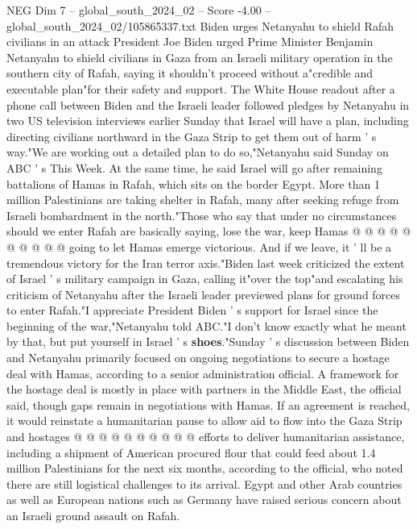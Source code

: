 \begin{textsample}{NEG Dim 7 – global\_south\_2024\_02 – Score -4.00 – global\_south\_2024\_02/105865337.txt}  \label{ex:f7_neg_399}
Biden urges Netanyahu to shield Rafah civilians in an attack President Joe Biden urged Prime Minister Benjamin Netanyahu to shield civilians in Gaza from an Israeli military operation in the southern city of Rafah, saying it shouldn't proceed without a"credible and executable plan"for their safety and support.
The White House readout after a phone call between Biden and the Israeli leader followed pledges by Netanyahu in two US television interviews earlier Sunday that Israel will have a plan, including directing civilians northward in the Gaza Strip to get them out of harm ' s way."We are working out a detailed plan to do so,"Netanyahu said Sunday on ABC ' s This Week.
At the same time, he said Israel will go after remaining battalions of Hamas in Rafah, which sits on the border Egypt.
More than 1 million Palestinians are taking shelter in Rafah, many after seeking refuge from Israeli bombardment in the north."Those who say that under no circumstances should we enter Rafah are basically saying, lose the war, keep Hamas @ @ @ @ @ @ @ @ @ @ going to let Hamas emerge victorious.
And if we leave, it ' ll be a tremendous victory for the Iran terror axis."Biden last week criticized the extent of Israel ' s military campaign in Gaza, calling it"over the top"and escalating his criticism of Netanyahu after the Israeli leader previewed plans for ground forces to enter Rafah."I appreciate President Biden ' s support for Israel since the beginning of the war,"Netanyahu told ABC."I don't know exactly what he meant by that, but put yourself in Israel ' s \textbf{shoes}."Sunday ' s discussion between Biden and Netanyahu primarily focused on ongoing negotiations to secure a hostage deal with Hamas, according to a senior administration official.
A framework for the hostage deal is mostly in place with partners in the Middle East, the official said, though gaps remain in negotiations with Hamas.
If an agreement is reached, it would reinstate a humanitarian pause to allow aid to flow into the Gaza Strip and hostages @ @ @ @ @ @ @ @ @ @ efforts to deliver humanitarian assistance, including a shipment of American procured flour that could feed about 1.4 million Palestinians for the next six months, according to the official, who noted there are still logistical challenges to its arrival.
Egypt and other Arab countries as well as European nations such as Germany have raised serious concern about an Israeli ground assault on Rafah.

\end{textsample}
